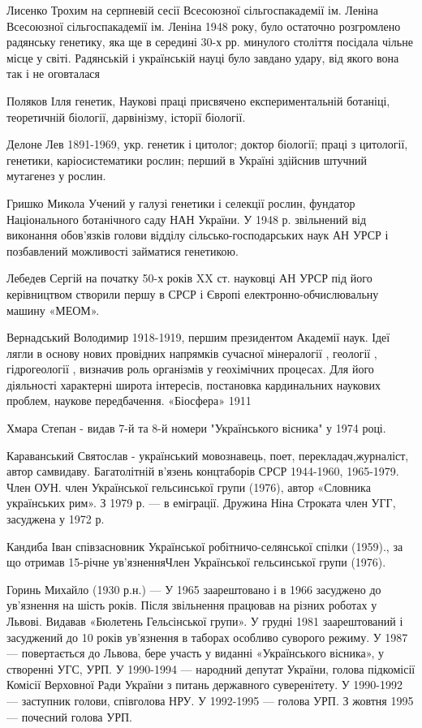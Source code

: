 Лисенко Трохим на серпневій сесії Всесоюзної сільгоспакадемії ім. Леніна Всесоюзної сільгоспакадемії ім. Леніна 1948 року, було остаточно розгромлено радянську генетику, яка ще в середині 30-х рр. минулого століття посідала чільне місце у світі. Радянській і українській науці було завдано удару, від якого вона так і не оговталася

Поляков Ілля генетик, Наукові праці присвячено експериментальній ботаніці, теоретичній біології, дарвінізму, історії біології.

Делоне Лев 1891-1969, укр. генетик і цитолог; доктор біології; праці з цитології, генетики, каріосистематики рослин; перший в Україні здійснив штучний мутагенез у рослин.

Гришко Микола Учений у галузі генетики і селекції рослин, фундатор Національного ботанічного саду НАН України. У 1948 р. звільнений від виконання обов'язків голови відділу сільсько-господарських наук АН УРСР і позбавлений можливості займатися генетикою.

Лебедев Сергій на початку 50-х років XX ст. науковці АН УРСР під його керівництвом створили першу в СРСР і Європі електронно-обчислювальну машину «МЕОМ».

Вернадський Володимир 1918-1919, першим президентом Академії наук. Ідеї лягли в основу нових провідних напрямків сучасної мінералогії , геології , гідрогеології , визначив роль організмів у геохімічних процесах. Для його діяльності характерні широта інтересів, постановка кардинальних наукових проблем, наукове передбачення. «Біосфера» 1911

Хмара Степан  - видав 7-й та 8-й номери "Українського вісника" у 1974 році.

Караванський Святослав - український мовознавець, поет, перекладач,журналіст, автор самвидаву. Багатолітній в'язень концтаборів СРСР 1944-1960, 1965-1979. Член ОУН. член Української гельсинської групи (1976), автор «Словника українських рим». З 1979 р. --- в еміграції. Дружина Ніна Строката член УГГ, засуджена у 1972 р.

Кандиба Іван співзасновник Української робітничо-селянської спілки (1959)., за що отримав 15-річне ув’язненняЧлен Української гельсинської групи (1976).

Горинь Михайло (1930 р.н.) --- У 1965 заарештовано і в 1966 засуджено до ув'язнення на шість років. Після звільнення працював на різних роботах у Львові. Видавав «Бюлетень Гельсінської групи». У грудні 1981 заарештований і засуджений до 10 років ув'язнення в таборах особливо суворого режиму. У 1987 --- повертається до Львова, бере участь у виданні «Українського вісника», у створенні УГС, УРП. У 1990-1994 --- народний депутат України, голова підкомісії Комісії Верховної Ради України з питань державного суверенітету. У 1990-1992 --- заступник голови, співголова НРУ. У 1992-1995 --- голова УРП. З жовтня 1995 --- почесний голова УРП.

